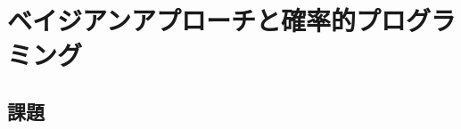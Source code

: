 \documentclass{ltjsbook}
\begin{document}
 
\chapter{ベイジアンアプローチと確率的プログラミング}
\label{chapter23} 


\section{課題}
\end{document}
